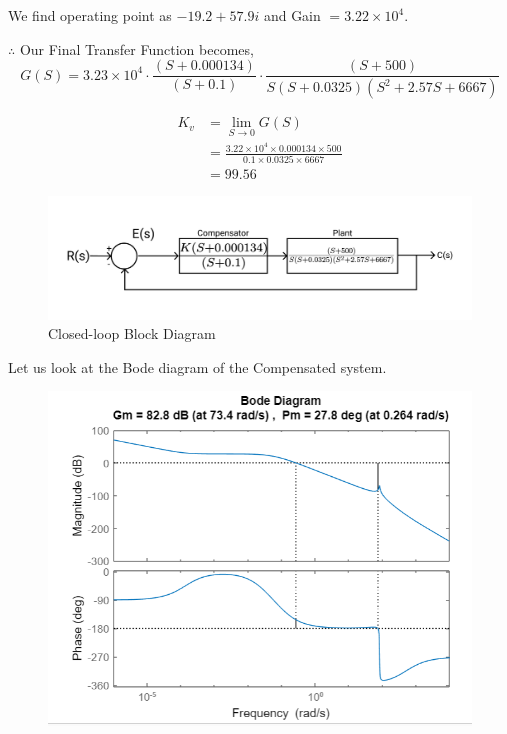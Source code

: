 \documentclass[12pt]{article}
\begin{document}
We find operating point as \(-19.2 + 57.9i\) and Gain \(= 3.22 \times 10^4\). \par

\(\therefore\) Our Final Transfer Function becomes,
\begin{equation}
  G(S) = 3.23 \times 10^4 \cdot \frac{(S+0.000134)}{(S+0.1)} \cdot \frac{(S+500)}{S(S+0.0325)(S^2 + 2.57S + 6667)}
\end{equation}

\begin{equation}
  \begin{aligned}
    K_v &= \lim_{S \rightarrow 0} G(S)\\
    &= \frac{3.22 \times 10^4 \times 0.000134 \times 500}{0.1 \times 0.0325 \times 6667} \\
    &= 99.56
  \end{aligned}
\end{equation}

\begin{figure}[H]
  \centering
  \includegraphics[width=0.8\linewidth]{images/block_diagram.png}
  \caption{Closed-loop Block Diagram}
  \label{fig:block_diagram}
\end{figure}

Let us look at the Bode diagram of the Compensated system.\par

\begin{figure}[H]
  \centering
  \includegraphics[width=0.8\linewidth]{images/plot7.png}
  \label{fig:plot_7}
\end{figure}
\end{document}
